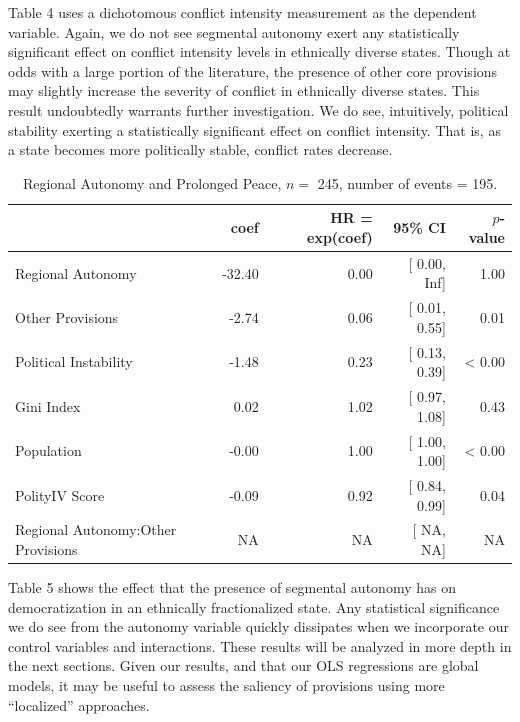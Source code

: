 \documentclass[12pt]{article}
\begin{document}
Table 4 uses a dichotomous conflict intensity measurement as the dependent variable. Again, we do not see segmental autonomy exert any statistically significant effect on conflict intensity levels in ethnically diverse states. Though at odds with a large portion of the literature, the presence of other core provisions may slightly increase the severity of conflict in ethnically diverse states. This result undoubtedly warrants further investigation. We do see, intuitively, political stability exerting a statistically significant effect on conflict intensity. That is, as a state becomes more politically stable, conflict rates decrease.  

\begin{table}[!htbp]
	\centering
	\begingroup\footnotesize
	\begin{tabular}{lrrrr}
		\hline
		& coef & HR = exp(coef) & 95\% CI & $p$-value \\ 
		\hline
		Regional Autonomy & -32.40 & 0.00 & [ 0.00,   Inf] & 1.00 \\ 
		Other Provisions & -2.74 & 0.06 & [ 0.01,  0.55] & 0.01 \\ 
		Political Instability & -1.48 & 0.23 & [ 0.13,  0.39] & < 0.00 \\ 
		Gini Index & 0.02 & 1.02 & [ 0.97,  1.08] & 0.43 \\ 
		Population & -0.00 & 1.00 & [ 1.00,  1.00] & < 0.00 \\ 
		PolityIV Score & -0.09 & 0.92 & [ 0.84,  0.99] & 0.04 \\ 
		Regional Autonomy:Other Provisions & NA & NA & [   NA,    NA] & NA \\ 
		\hline
	\end{tabular}
	\endgroup
	\caption{Regional Autonomy and Prolonged Peace, $n = $ 245, number of events = 195.} 
	\label{mod}
\end{table}

Table 5 shows the effect that the presence of segmental autonomy has on democratization in an ethnically fractionalized state. Any statistical significance we do see from the autonomy variable quickly dissipates when we incorporate our control variables and interactions. These results will be analyzed in more depth in the next sections. Given our results, and that our OLS regressions are global models, it may be useful to assess the saliency of provisions using more “localized” approaches.
\end{document}
